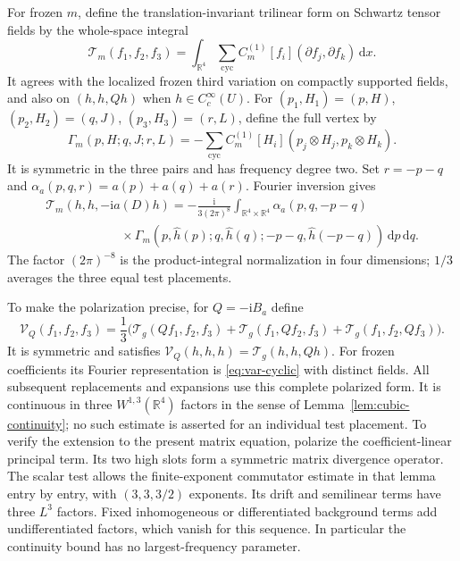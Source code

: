 \documentclass[11pt,a4paper]{article}
\numberwithin{equation}{section}
\newcommand{\dd}{\mathrm d}
\newcommand{\R}{\mathbb R}
\newcommand{\f}[2]{\frac{#1}{#2}}
\newcommand{\ii}{\mathrm{i}}
\theoremstyle{definition}
\begin{document}
For frozen $m$, define the translation-invariant trilinear form on
Schwartz tensor fields by the whole-space integral
\begin{equation*}
\mathcal T_m(f_1,f_2,f_3)
=\int_{\R^4}\sum_{\mathrm{cyc}}
 C_m^{(1)}[f_i](\partial f_j,\partial f_k)\,\dd x.
\end{equation*}
It agrees with the localized frozen third variation on compactly
supported fields, and also on $(h,h,Qh)$ when $h\in C_c^\infty(U)$.
For $(p_1,H_1)=(p,H)$, $(p_2,H_2)=(q,J)$,
$(p_3,H_3)=(r,L)$, define the full vertex by
\begin{equation*}
\Gamma_m(p,H;q,J;r,L)
=-\sum_{\mathrm{cyc}}C_m^{(1)}[H_i]
                  (p_j\otimes H_j,p_k\otimes H_k).
\end{equation*}
It is symmetric in the three pairs and has frequency degree two.
Set $r=-p-q$ and $\alpha_a(p,q,r)=a(p)+a(q)+a(r)$. Fourier inversion gives
\begin{equation}\label{eq:var-cyclic}
\begin{split}
\mathcal T_m(h,h,-\ii a(D)h)
=-\f{\ii}{3(2\pi)^8}\int_{\R^4\times\R^4}
 \alpha_a(p,q,-p-q)\\
\qquad\qquad\qquad\times
 \Gamma_m(p,\widehat h(p);q,\widehat h(q);-p-q,\widehat h(-p-q))
 \,\dd p\,\dd q.
\end{split}
\end{equation}
The factor $(2\pi)^{-8}$ is the product-integral normalization in four
dimensions; $1/3$ averages the three equal test placements.

To make the polarization precise, for $Q=-\ii B_a$ define
\begin{equation*}
\mathcal V_Q(f_1,f_2,f_3)=\f13\bigl(
\mathcal T_g(Qf_1,f_2,f_3)+\mathcal T_g(f_1,Qf_2,f_3)
+\mathcal T_g(f_1,f_2,Qf_3)\bigr).
\end{equation*}
It is symmetric and satisfies
$\mathcal V_Q(h,h,h)=\mathcal T_g(h,h,Qh)$. For frozen coefficients
its Fourier representation is \eqref{eq:var-cyclic} with distinct fields.
All subsequent replacements and expansions use this complete polarized
form. It is continuous in three $W^{1,3}(\R^4)$ factors in the sense of
Lemma~\ref{lem:cubic-continuity}; no such estimate is asserted for an
individual test placement. To verify the extension to the present
matrix equation, polarize the coefficient-linear principal term. Its two
high slots form a symmetric matrix divergence operator. The scalar test
allows the finite-exponent commutator estimate in that lemma entry by
entry, with $(3,3,3/2)$ exponents. Its drift and semilinear terms have
three $L^3$ factors. Fixed inhomogeneous or differentiated background
terms add undifferentiated factors, which vanish for this sequence. In
particular the continuity bound has no largest-frequency parameter.
\end{document}
